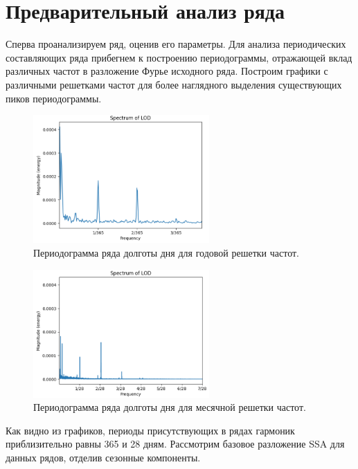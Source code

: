 \documentclass[specialist,
			   substylefile = spbu_report.rtx,
			   subf,href,colorlinks=true, 12pt]{disser}
\begin{document}
\section{Предварительный анализ ряда}

Сперва проанализируем ряд, оценив его параметры. Для анализа периодических составляющих ряда прибегнем к построению периодограммы, отражающей вклад различных частот в разложение Фурье исходного ряда. Построим графики с различными решетками частот для более наглядного выделения существующих пиков периодограммы.

\begin{figure}[H]
	\centering
	\includegraphics[width=0.6\textwidth]{py_lod_spec_365}
	\caption{Периодограмма ряда долготы дня для годовой решетки частот.}
	\label{fig:py_lod_spec_365}
\end{figure}

\begin{figure}[H]
	\centering
	\includegraphics[width=0.6\textwidth]{py_lod_spec_28}
	\caption{Периодограмма ряда долготы дня для месячной решетки частот.}
	\label{fig:py_lod_spec_28}
\end{figure}


Как видно из графиков, периоды присутствующих в рядах гармоник приблизительно равны 365 и 28 дням. Рассмотрим базовое разложение SSA для данных рядов, отделив сезонные компоненты. 
\end{document}
